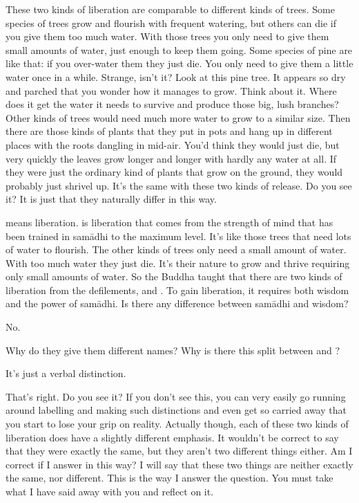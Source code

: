These two kinds of liberation are comparable to different kinds of trees. Some species of trees grow and flourish with frequent watering, but others can die if you give them too much water. With those trees you only need to give them small amounts of water, just enough to keep them going. Some species of pine are like that: if you over-water them they just die. You only need to give them a little water once in a while. Strange, isn't it? Look at this pine tree. It appears so dry and parched that you wonder how it manages to grow. Think about it. Where does it get the water it needs to survive and produce those big, lush branches? Other kinds of trees would need much more water to grow to a similar size. Then there are those kinds of plants that they put in pots and hang up in different places with the roots dangling in mid-air. You'd think they would just die, but very quickly the leaves grow longer and longer with hardly any water at all. If they were just the ordinary kind of plants that grow on the ground, they would probably just shrivel up. It's the same with these two kinds of release. Do you see it? It is just that they naturally differ in this way.

 means liberation.  is liberation that comes from the strength of mind that has been trained in sam\=adhi to the maximum level. It's like those trees that need lots of water to flourish. The other kinds of trees only need a small amount of water. With too much water they just die. It's their nature to grow and thrive requiring only small amounts of water. So the Buddha taught that there are two kinds of liberation from the defilements,  and . To gain liberation, it requires both wisdom and the power of sam\=adhi. Is there any difference between sam\=adhi and wisdom? 

 No.

 Why do they give them different names? Why is there this split between  and ?

 It's just a verbal distinction.

 That's right. Do you see it? If you don't see this, you can very easily go running around labelling and making such distinctions and even get so carried away that you start to lose your grip on reality. Actually though, each of these two kinds of liberation does have a slightly different emphasis. It wouldn't be correct to say that they were exactly the same, but they aren't two different things either. Am I correct if I answer in this way? I will say that these two things are neither exactly the same, nor different. This is the way I answer the question. You must take what I have said away with you and reflect on it.

